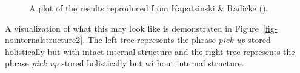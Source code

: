 \documentclass[
  12pt,
  letterpaper,
]{scrreport}
\begin{document}
\begin{figure}[htbp]

\caption{\label{fig-kapatsinskiplot2}A plot of the results reproduced
from Kapatsinski \& Radicke
().}


\end{figure}%

A visualization of what this may look like is demonstrated in
Figure~\ref{fig-nointernalstructure2}. The left tree represents the
phrase \emph{pick up} stored holistically but with intact internal
structure and the right tree represents the phrase \emph{pick up} stored
holistically but without internal structure.
\end{document}
